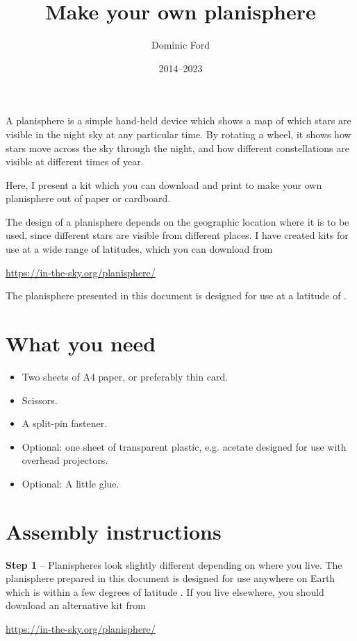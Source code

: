 \documentclass[a4paper,onecolumn,10pt]{article}
\title{Make your own planisphere}
\author{Dominic Ford}
\date{2014--2023}
\begin{document}
\maketitle
\setcounter{footnote}{1}

A planisphere is a simple hand-held device which shows a map of which stars are
visible in the night sky at any particular time. By rotating a wheel, it shows
how stars move across the sky through the night, and how different
constellations are visible at different times of year.

Here, I present a kit which you can download and print to make your own
planisphere out of paper or cardboard.

The design of a planisphere depends on the geographic location where it is to
be used, since different stars are visible from different places. I have
created kits for use at a wide range of latitudes, which you can download from

\url{https://in-the-sky.org/planisphere/}

The planisphere presented in this document is designed for use at a latitude of
.
 
\section*{What you need}

\begin{itemize}
\item Two sheets of A4 paper, or preferably thin card.
\item Scissors.
\item A split-pin fastener.
\item Optional: one sheet of transparent plastic, e.g. acetate designed for use with overhead projectors.
\item Optional: A little glue.
\end{itemize}

\section*{Assembly instructions}

{\bf Step 1} -- Planispheres look slightly different depending on where you
live. The planisphere prepared in this document is designed for use anywhere on
Earth which is within a few degrees of latitude . If you live
elsewhere, you should download an alternative kit from

\url{https://in-the-sky.org/planisphere/}
\end{document}
